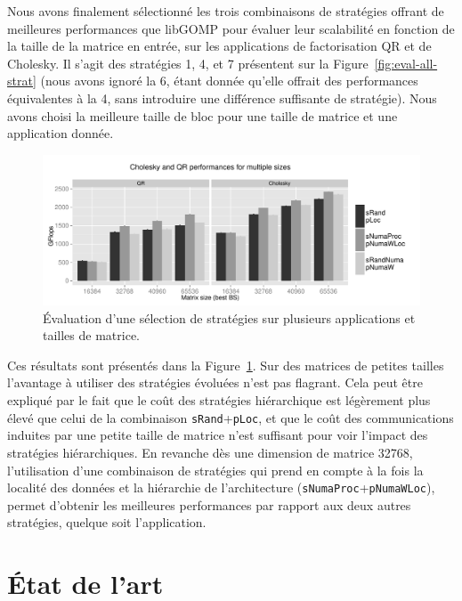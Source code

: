 \documentclass[parallelisme]{compas2016}
\begin{document}
Nous avons finalement sélectionné les trois combinaisons de stratégies offrant de meilleures
performances que libGOMP pour évaluer leur scalabilité en fonction de la taille
de la matrice en entrée, sur les applications de factorisation QR et de Cholesky. Il s'agit des stratégies 1,
4, et 7 présentent sur la Figure~\ref{fig:eval-all-strat} (nous avons ignoré la 6, étant donnée
qu'elle offrait des performances équivalentes à la 4, sans introduire une différence suffisante de stratégie).
Nous avons choisi la meilleure taille de bloc pour une taille de matrice et une application donnée.

\begin{figure}[t]
  \centering
  \includegraphics[scale=0.5]{figures/graph_details_strat.pdf}
  \caption{Évaluation d'une sélection de stratégies sur plusieurs applications et
  tailles de matrice.}
\label{fig:eval-details-strat}
\end{figure}

Ces résultats sont présentés dans la Figure~\ref{fig:eval-details-strat}.
Sur des matrices de petites tailles l'avantage à utiliser des stratégies évoluées
n'est pas flagrant. Cela peut être expliqué par le fait que le coût des stratégies
hiérarchique est légèrement plus élevé que celui de la combinaison \verb/sRand/+\verb/pLoc/,
et que le coût des communications induites par une petite taille de matrice n'est suffisant
pour voir l'impact des stratégies hiérarchiques.
En revanche dès une dimension de matrice 32768, l'utilisation d'une combinaison
de stratégies qui prend en compte à la fois la localité des données et la hiérarchie
de l'architecture (\verb/sNumaProc/+\verb/pNumaWLoc/), permet d'obtenir les
meilleures performances par rapport aux deux autres stratégies, quelque
soit l'application.

\section{État de l'art}
\label{sec:related-work}
\end{document}

